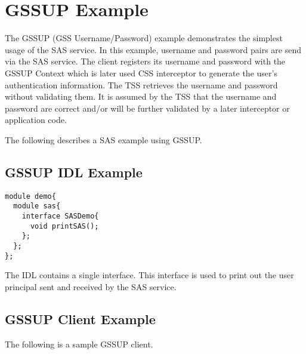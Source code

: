 \section{GSSUP Example}

The GSSUP (GSS Username/Password) example demonstrates the simplest
usage of the SAS service. In this example, username and password
pairs are send via the SAS service. The client registers its username
and password with the GSSUP Context which is later used CSS interceptor
to generate the user's authentication information.
The TSS retrieves the username and password
without validating them. It is assumed by the TSS that the username
and password are correct and/or will be further validated by a later
interceptor or application code.

The following describes a SAS example using GSSUP.

\subsection{GSSUP IDL Example}

\begin{scriptsize}
\begin{verbatim}
module demo{
  module sas{
    interface SASDemo{
      void printSAS();
    };
  };
};
\end{verbatim}
\end{scriptsize}

The IDL contains a single interface. This interface is used to print out
the user principal sent and received by the SAS service.

\subsection{GSSUP Client Example}

The following is a sample GSSUP client.

